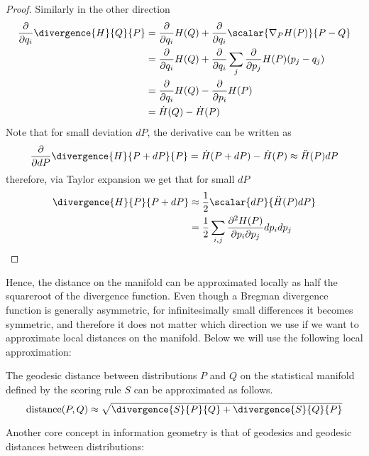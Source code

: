 \begin{statement}
\begin{proof}
		Similarly in the other direction
			\begin{align}
					\frac{\partial}{\partial q_i} \divergence{H}{Q}{P} &=  \frac{\partial}{\partial q_i} H(Q) +     \frac{\partial}{\partial q_i}\scalar{\nabla_{P} H(P)}{P - Q}\\
						&=  \frac{\partial}{\partial q_i} H(Q) + \frac{\partial}{\partial q_i}\sum_{j} \frac{\partial}{\partial p_j} H(P) (p_j - q_j)\\
						&=  \frac{\partial}{\partial q_i} H(Q)  - \frac{\partial}{\partial p_i} H(P)\\
						&= \dot{H}(Q) - \dot{H}(P)
			\end{align}
			Note that for small deviation $dP$, the derivative can be written as
			\begin{align}
				\frac{\partial}{\partial dP} \divergence{H}{P+dP}{P} = \dot{H}(P+dP) - \dot{H}(P) \approx  \ddot{H}(P) dP
			\end{align}
			therefore, via Taylor expansion we get that for small $dP$
			\begin{align}
				\divergence{H}{P}{P+dP} &\approx \frac{1}{2} \scalar{dP}{\ddot{H}(P)dP}\\
					&= \frac{1}{2} \sum_{i,j} \frac{\partial^2 H(P)}{\partial p_i\partial p_j} dp_{i} dp_j
			\end{align}
	\end{proof}
\end{statement}

Hence, the distance on the manifold can be approximated locally as half the squareroot of the divergence function. Even though a Bregman divergence function is generally asymmetric, for infinitesimally small differences it becomes symmetric, and therefore it does not matter which direction we use if we want to approximate local distances on the manifold. Below we will use the following local approximation:

\begin{corollary}
	The geodesic distance between distributions $P$ and $Q$ on the statistical manifold defined by the scoring rule $S$ can be approximated as follows.
	\begin{equation}
		\mbox{distance}(P,Q) \approx \sqrt{\divergence{S}{P}{Q} + \divergence{S}{Q}{P}} \label{Eqn:local_approximation}
	\end{equation}
\end{corollary}

Another core concept in information geometry is that of geodesics and geodesic distances between distributions:

